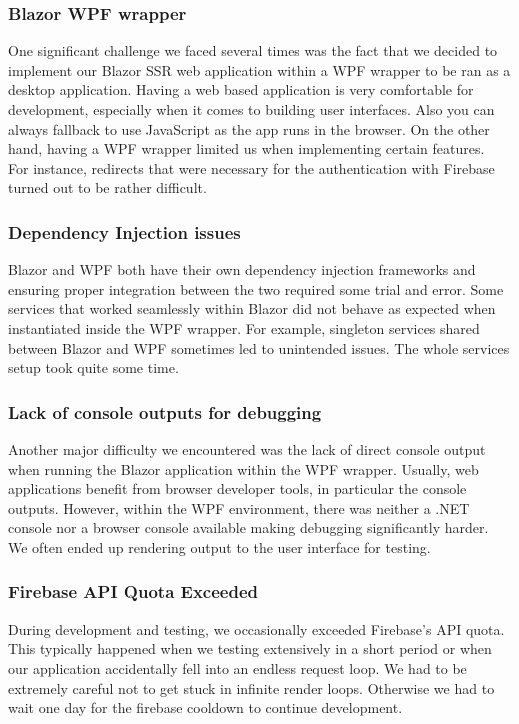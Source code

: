 \documentclass{article}
\begin{document}
\subsubsection{Blazor WPF wrapper}
One significant challenge we faced several times was the fact that we decided to implement our Blazor SSR web application within a WPF wrapper to be ran as a desktop application.
Having a web based application is very comfortable for development, especially when it comes to building user interfaces. Also you can always fallback to use JavaScript as the app runs in the browser.
On the other hand, having a WPF wrapper limited us when implementing certain features.\\
For instance, redirects that were necessary for the authentication with Firebase turned out to be rather difficult.

\subsubsection{Dependency Injection issues}
Blazor and WPF both have their own dependency injection frameworks and ensuring proper integration between the two required some trial and error.
Some services that worked seamlessly within Blazor did not behave as expected when instantiated inside the WPF wrapper.
For example, singleton services shared between Blazor and WPF sometimes led to unintended issues.
The whole services setup took quite some time.

\subsubsection{Lack of console outputs for debugging}
Another major difficulty we encountered was the lack of direct console output when running the Blazor application within the WPF wrapper.
Usually, web applications benefit from browser developer tools, in particular the console outputs.
However, within the WPF environment, there was neither a .NET console nor a browser console available making debugging significantly harder.
We often ended up rendering output to the user interface for testing.

\subsubsection{Firebase API Quota Exceeded}
During development and testing, we occasionally exceeded Firebase's API quota.
This typically happened when we testing extensively in a short period or when our application accidentally fell into an endless request loop.
We had to be extremely careful not to get stuck in infinite render loops.
Otherwise we had to wait one day for the firebase cooldown to continue development.
\end{document}
